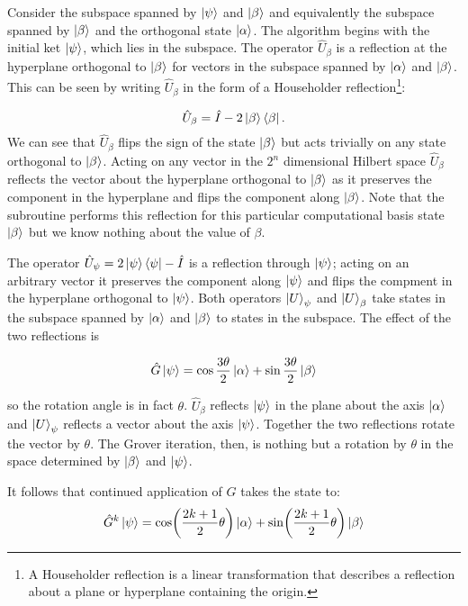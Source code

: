 Consider the subspace spanned by $\ket{\psi}$ and $\ket{\beta}$ and equivalently the subspace spanned by $\ket{\beta}$ and the orthogonal state $\ket{\alpha}$.
The algorithm begins with the initial ket $\ket{\psi}$, which lies in the subspace. The operator $\hat{U}_\beta$ is a reflection at the hyperplane orthogonal to $\ket{\beta}$ for vectors in the subspace spanned by $\ket{\alpha}$ and $\ket{\beta}$. This can be seen by writing $\hat{U}_\beta$ in the form of a Householder reflection\footnote{A Householder reflection is a linear transformation that describes a reflection about a plane or hyperplane containing the origin.}:

\begin{equation*}
    \hat{U}_\beta = \hat{I} - 2 \ket{\beta}\bra{\beta}.
\end{equation*}
We can see that $\hat{U}_\beta$ flips the sign of the state $\ket{\beta}$ but acts trivially on any state orthogonal to $\ket{\beta}$. Acting on any vector in the $2^n$ dimensional Hilbert space $\hat{U}_\beta$  reflects the vector about the hyperplane orthogonal to $\ket{\beta}$ as it preserves the component in the hyperplane and flips the component along $\ket{\beta}$. Note that the subroutine performs this reflection for this particular computational basis state $\ket{\beta}$ but we know nothing about the value of $\beta$.

 The operator $\hat{U}_\psi = 2 \ket{\psi}\bra{\psi} - \hat{I}$ is a reflection through $\ket{\psi}$; acting on an arbitrary vector it preserves the component along $\ket{\psi}$ and flips the compment in the hyperplane orthogonal to $\ket{\psi}$. Both operators $\ket{U}_\psi$ and $\ket{U}_\beta$ take states in the subspace spanned by $\ket{\alpha}$ and $\ket{\beta}$ to states in the subspace. The effect of the two reflections is
 
 \begin{equation*}
    \hat{G}\ket{\psi} = \cos\frac{3\theta}{2} \ket{\alpha} + \sin\frac{3\theta}{2} \ket{\beta}
\end{equation*}

so the rotation angle is in fact $\theta$. $\hat{U}_\beta$ reflects $\ket{\psi}$ in the plane about the axis $\ket{\alpha}$ and $\ket{U}_\psi$ reflects a vector about the axis $\ket{\psi}$. Together the two reflections rotate the vector by $\theta$. The Grover iteration, then, is nothing but a rotation by $\theta$ in the space determined by $\ket{\beta}$ and $\ket{\psi}$.

It follows that continued application of $G$ takes the state to:
\begin{equation*}
    \hat{G}^{k}\ket{\psi} = \cos\biggl(\frac{2k+1}{2}\theta\biggr) \ket{\alpha} + \sin\biggl(\frac{2k+1}{2}\theta\biggr) \ket{\beta}
\end{equation*}

